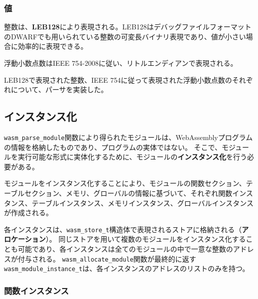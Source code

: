 \subsubsection{値}

整数は、{\bf LEB128}により表現される。LEB128はデバッグファイルフォーマットのDWARFでも用いられている\cite{dwarf}整数の可変長バイナリ表現であり、値が小さい場合に効率的に表現できる。

浮動小数点数はIEEE 754-2008\cite{ieee754}に従い、リトルエンディアンで表現される。

LEB128で表現された整数、IEEE 754に従って表現された浮動小数点数のそれぞれについて、パーサを実装した。




\subsection{インスタンス化}

\verb|wasm_parse_module|関数により得られたモジュールは、WebAssemblyプログラムの情報を格納したものであり、プログラムの実体ではない。
そこで、モジュールを実行可能な形式に実体化するために、モジュールの{\bf インスタンス化}を行う必要がある。

モジュールをインスタンス化することにより、モジュールの関数セクション、テーブルセクション、メモリ、グローバルの情報に基づいて、それぞれ関数インスタンス、テーブルインスタンス、メモリインスタンス、グローバルインスタンスが作成される。

各インスタンスは、\verb|wasm_store_t|構造体で表現されるストアに格納される（{\bf アロケーション}）。
同じストアを用いて複数のモジュールをインスタンス化することも可能であり、各インスタンスは全てのモジュールの中で一意な整数のアドレスが付与される。
\verb|wasm_allocate_module|関数が最終的に返す\verb|wasm_module_instance_t|は、各インスタンスのアドレスのリストのみを持つ。

\subsubsection{関数インスタンス}

